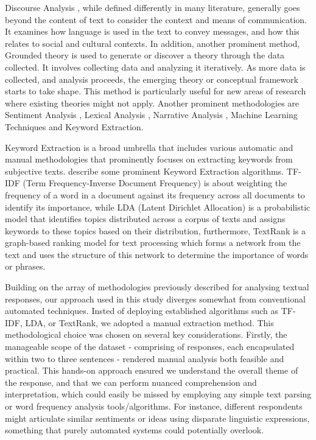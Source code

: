 Discourse Analysis \parencite{gill2000discourse}, while defined differently in many literature, generally goes beyond the content of text to consider the context and means of communication. It examines how language is used in the text to convey messages, and how this relates to social and cultural contexts. In addition, another prominent method, Grounded theory \parencite{birks2015grounded_ch1} is used to generate or discover a theory through the data collected. It involves collecting data and analyzing it iteratively. As more data is collected, and analysis proceeds, the emerging theory or conceptual framework starts to take shape. This method is particularly useful for new areas of research where existing theories might not apply. Another prominent methodologies are Sentiment Analysis \parencite{Wankhade2022AChallenges}, Lexical Analysis \parencite{Bolden2000BridgingDivide}, Narrative Analysis \parencite{Burck2005ComparingAnalysis}, Machine Learning Techniques \parencite{Jain2021AReviews, Alantari2022AnReviews} and Keyword Extraction.

Keyword Extraction \parencite{Firoozeh2020KeywordMethods, Bharti2017AutomaticSurvey} is a broad umbrella that includes various automatic and manual methodologies that prominently focuses on extracting keywords from subjective texts. \textcite{Yuan2018TextStrategy} describe some prominent Keyword Extraction algorithms. TF-IDF (Term Frequency-Inverse Document Frequency) is about weighting the frequency of a word in a document against its frequency across all documents to identify its importance, while LDA (Latent Dirichlet Allocation) is a probabilistic model that identifies topics distributed across a corpus of texts and assigns keywords to these topics based on their distribution, furthermore, TextRank is a graph-based ranking model for text processing which forms a network from the text and uses the structure of this network to determine the importance of words or phrases. 

Building on the array of methodologies previously described for analysing textual responses, our approach used in this study diverges somewhat from conventional automated techniques. Insted of deploying established algorithms such as TF-IDF, LDA, or TextRank, we adopted a manual extraction method. This methodological choice was chosen on several key considerations. Firstly, the manageable scope of the dataset - comprising of \participantCount{} responses, each encapsulated within two to three sentences - rendered manual analysis both feasible and practical. This hands-on approach ensured we understand the overall theme of the response, and that we can perform nuanced comprehension and interpretation, which could easily be missed by employing any simple text parsing or word frequency analysis tools/algorithms. For instance, different respondents might articulate similar sentiments or ideas using disparate linguistic expressions, something that purely automated systems could potentially overlook. 

